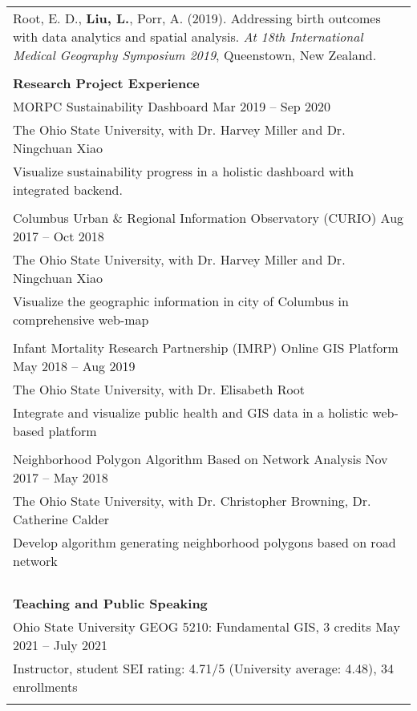 \documentclass[letterpaper, 11pt]{article}
\begin{document}
\begin{longtable}{p{6.5in}}
Root, E. D., \textbf{Liu, L.}, Porr, A. (2019). Addressing birth outcomes with data analytics and spatial analysis. \textit{At 18th International Medical Geography Symposium 2019}, Queenstown, New Zealand.	\\\\


\nohyphens{\textbf{Research Project Experience}} \\
MORPC Sustainability Dashboard \hfill Mar 2019 -- Sep 2020 \\
The Ohio State University, with Dr. Harvey Miller and Dr. Ningchuan Xiao \\
Visualize sustainability progress in a holistic dashboard with integrated backend. \\\\

Columbus Urban \& Regional Information Observatory (CURIO) \hfill Aug 2017 -- Oct 2018 \\
The Ohio State University, with Dr. Harvey Miller and Dr. Ningchuan Xiao \\
Visualize the geographic information in city of Columbus in comprehensive web-map \\\\

Infant Mortality Research Partnership (IMRP) Online GIS Platform \hfill May 2018 -- Aug 2019 \\
The Ohio State University, with Dr. Elisabeth Root \\
Integrate and visualize public health and GIS data in a holistic web-based platform \\\\

Neighborhood Polygon Algorithm Based on Network Analysis \hfill Nov 2017 -- May 2018 \\
The Ohio State University, with Dr. Christopher Browning, Dr. Catherine Calder \\
Develop algorithm generating neighborhood polygons based on road network \\\\


\\\\\\

\textbf{Teaching and Public Speaking} \\
Ohio State University GEOG 5210: Fundamental GIS, 3 credits \hfill May 2021 -- July 2021 \\
Instructor, student SEI rating: 4.71/5 (University average: 4.48), 34 enrollments \\\\


\end{longtable}
\end{document}
